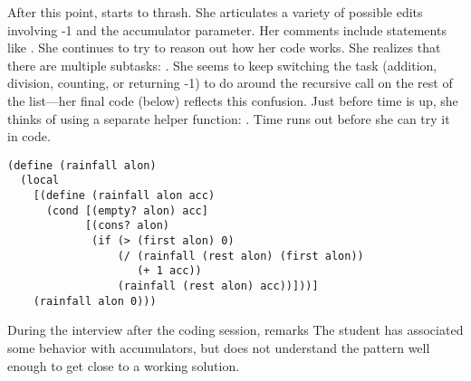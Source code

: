 After this point, \sthree starts to thrash. She articulates a variety
of possible edits involving -1 and the accumulator parameter.  Her
comments include statements like .  She continues to try to reason out how her code
works.  She realizes that there are multiple subtasks:
. She seems to keep
switching the task (addition, division, counting, or
returning -1) to do around the recursive call on the rest of the
list---her final code (below) reflects this confusion.  Just before time is up, she thinks of using a separate
helper function: . Time runs out before she can try it in code.

\begin{lstlisting}
(define (rainfall alon)
  (local
    [(define (rainfall alon acc)
      (cond [(empty? alon) acc]
            [(cons? alon)
             (if (> (first alon) 0)
                 (/ (rainfall (rest alon) (first alon))
                    (+ 1 acc))
                 (rainfall (rest alon) acc))]))]
    (rainfall alon 0)))
\end{lstlisting}

During the interview after the coding session, \sthree remarks
 The student has
  associated some behavior with accumulators, but does not understand
  the pattern well enough to get close to a working solution.






